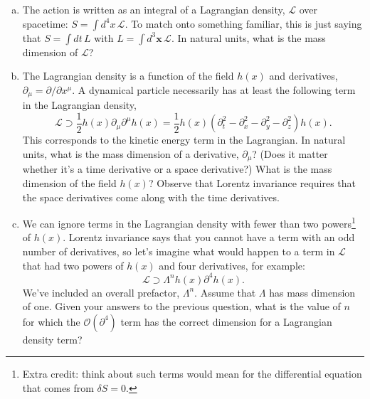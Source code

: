 \documentclass[12pt]{article}
\numberwithin{equation}{section}    %
\begin{document}
\begin{enumerate}[(a)]
	\item The action is written as an integral of a Lagrangian density, $\mathcal L$ over spacetime: $S = \int d^4x \, \mathcal L$. To match onto something familiar, this is just saying that $S = \int dt \, L$ with $L = \int d^3\mathbf{x} \, \mathcal L$. In natural units, what is the mass dimension of $\mathcal L$?
	\item The Lagrangian density is a function of the field $h(x)$ and derivatives, $\partial_\mu = \partial/\partial x^\mu$. A dynamical particle necessarily has at least the following term in the Lagrangian density, $$\mathcal L \supset \frac 12 h(x) \partial_\mu \partial^\mu h(x) = \frac 12 h(x) \left(\partial_t^2 - \partial_x^2 - \partial_y^2 - \partial_z^2\right) h(x).$$ This corresponds to the kinetic energy term in the Lagrangian. In natural units, what is the mass dimension of a derivative, $\partial_\mu$? (Does it matter whether it's a time derivative or a space derivative?) What is the mass dimension of the field $h(x)$?  Observe that Lorentz invariance requires that the space derivatives come along with the time derivatives.
	\item We can ignore terms in the Lagrangian density with fewer than two powers\footnote{Extra credit: think about such terms would mean for the differential equation that comes from $\delta S = 0$.} of $h(x)$. Lorentz invariance says that you cannot have a term with an odd number of derivatives, so let's imagine what would happen to a term in $\mathcal L$ that had two powers of $h(x)$ and four derivatives, for example: $$\mathcal L \supset \Lambda^n h(x) \partial^4 h(x) .$$ We've included an overall prefactor, $\Lambda^n$. Assume that $\Lambda$ has mass dimension of one. Given your answers to the previous question, what is the value of $n$ for which the $\mathcal O(\partial^4)$ term has the correct dimension for a Lagrangian density term?

\end{enumerate}
\end{document}
